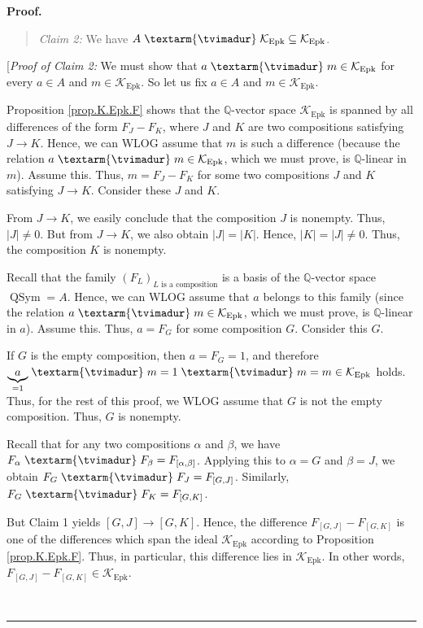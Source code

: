 \documentclass[numbers=enddot,12pt,final,onecolumn,notitlepage]{scrartcl}%
\theoremstyle{definition}
\newenvironment{statement}{\begin{quote}}{\end{quote}}
\newenvironment{proof}[1][Proof]{\noindent\textbf{#1.} }{\ \rule{0.5em}{0.5em}}
\newcommand{\tvi}{\left. \textarm{\tvimadur} \right.}
\begin{document}
\begin{proof}
\begin{statement}
\textit{Claim 2:} We have $A\tvi  \mathcal{K}_{\operatorname*{Epk}}%
\subseteq\mathcal{K}_{\operatorname*{Epk}}$.
\end{statement}

[\textit{Proof of Claim 2:} We must show that $a\tvi  m\in\mathcal{K}%
_{\operatorname*{Epk}}$ for every $a\in A$ and $m\in\mathcal{K}%
_{\operatorname*{Epk}}$. So let us fix $a\in A$ and $m\in\mathcal{K}%
_{\operatorname*{Epk}}$.

Proposition \ref{prop.K.Epk.F} shows that the $\mathbb{Q}$-vector space
$\mathcal{K}_{\operatorname*{Epk}}$ is spanned by all differences of the form
$F_{J}-F_{K}$, where $J$ and $K$ are two compositions satisfying $J\rightarrow
K$. Hence, we can WLOG assume that $m$ is such a difference (because the
relation $a\tvi  m\in\mathcal{K}_{\operatorname*{Epk}}$, which we must prove,
is $\mathbb{Q}$-linear in $m$). Assume this. Thus, $m=F_{J}-F_{K}$ for some
two compositions $J$ and $K$ satisfying $J\rightarrow K$. Consider these $J$
and $K$.

From $J\rightarrow K$, we easily conclude that the composition $J$ is
nonempty. Thus, $\left\vert J\right\vert \neq0$. But from $J\rightarrow K$, we
also obtain $\left\vert J\right\vert =\left\vert K\right\vert $. Hence,
$\left\vert K\right\vert =\left\vert J\right\vert \neq0$. Thus, the
composition $K$ is nonempty.

Recall that the family $\left(  F_{L}\right)  _{L\text{ is a composition}}$ is
a basis of the $\mathbb{Q}$-vector space $\operatorname*{QSym}=A$. Hence, we
can WLOG assume that $a$ belongs to this family (since the relation
$a\tvi  m\in\mathcal{K}_{\operatorname*{Epk}}$, which we must prove, is
$\mathbb{Q}$-linear in $a$). Assume this. Thus, $a=F_{G}$ for some composition
$G$. Consider this $G$.

If $G$ is the empty composition, then $a=F_{G}=1$, and therefore
$\underbrace{a}_{=1}\tvi  m=1\tvi  m=m\in\mathcal{K}_{\operatorname*{Epk}}$
holds. Thus, for the rest of this proof, we WLOG assume that $G$ is not the
empty composition. Thus, $G$ is nonempty.

Recall that for any two compositions $\alpha$ and $\beta$, we have $F_{\alpha
}\tvi  F_{\beta}=F_{\left[  \alpha,\beta\right]  }$. Applying this to
$\alpha=G$ and $\beta=J$, we obtain $F_{G}\tvi  F_{J}=F_{\left[  G,J\right]
}$. Similarly, $F_{G}\tvi  F_{K}=F_{\left[  G,K\right]  }$.

But Claim 1 yields $\left[  G,J\right]  \rightarrow\left[  G,K\right]  $.
Hence, the difference $F_{\left[  G,J\right]  }-F_{\left[  G,K\right]  }$ is
one of the differences which span the ideal $\mathcal{K}_{\operatorname*{Epk}%
}$ according to Proposition \ref{prop.K.Epk.F}. Thus, in particular, this
difference lies in $\mathcal{K}_{\operatorname*{Epk}}$. In other words,
$F_{\left[  G,J\right]  }-F_{\left[  G,K\right]  }\in\mathcal{K}%
_{\operatorname*{Epk}}$.


\end{proof}
\end{document}
